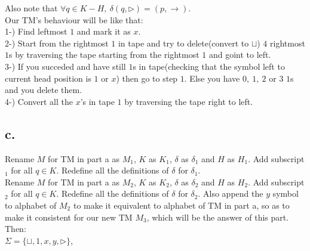 \documentclass[12pt]{article}
\begin{document}
Also note that $\forall q \in K - H,\ \delta(q, \triangleright) = (p, \rightarrow).$ \\

Our TM's behaviour will be like that:\\
1-) Find leftmost $1$ and mark it as $x$.\\
2-) Start from the rightmost $1$ in tape and try to delete(convert to $\sqcup$) $4$ 
rightmost $1$s by traversing the tape starting from the rightmost $1$ and goint to left.\\
3-) If you succeded and have still $1$s in tape(checking that the symbol left to 
current head position is $1$ or $x$) then go to step $1$. Else you have $0,\ 1,\ 2$ or 
$3$ $1$s and you delete them.\\
4-) Convert all the $x$'s in tape $1$ by traversing the tape right to left.\\

\subsection*{c.}

Rename $M$ for TM in part a as $M_1$, $K$ as $K_1$, $\delta$ as $\delta_1$ and $H$ as 
$H_1$. Add subscript $_1$ for all $q \in K$. Redefine all the definitions of $\delta$ 
for $\delta_1$.\\

Rename $M$ for TM in part a as $M_2$, $K$ as $K_2$, $\delta$ as $\delta_2$ and $H$ as 
$H_2$. Add subscript $_2$ for all $q \in K$. Redefine all the definitions of $\delta$ 
for $\delta_2$. Also append the $y$ symbol to alphabet of $M_2 $ to make it equivalent 
to alphabet of TM in part a, so as to make it consistent for our new TM $M_3$, which will
be the answer of this part.\\

Then:\\

$\Sigma = \{\sqcup, 1, x, y, \triangleright\}$,\\
\end{document}
